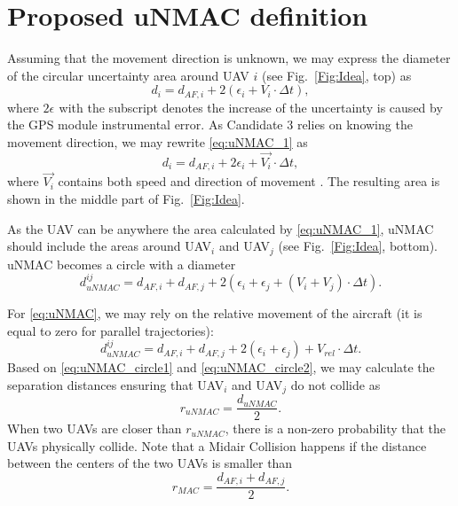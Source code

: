\documentclass[10pt,conference]{IEEEtran}
\begin{document}
\section{Proposed uNMAC definition}\label{sec:uNMAC}

Assuming that the movement direction is unknown, we may express the diameter of the circular uncertainty area around UAV $i$ (see Fig.~\ref{Fig:Idea}, top) as
\begin{equation}\label{eq:uNMAC_1}
    d_i = d_{AF,i} + 2(\epsilon_{i} + V_i\cdot\Delta t),
\end{equation}
where %
$2\epsilon_{}$ with the subscript denotes the increase of the uncertainty is caused by the GPS module instrumental error. As Candidate 3 relies on knowing the movement direction, we may rewrite \eqref{eq:uNMAC_1} as 
\begin{equation}\label{eq:uNMAC}
    d_i = d_{AF,i} + 2\epsilon_{i} + \vec{V_i}\cdot \Delta t,
\end{equation}
where $\vec{V_i}$ contains both speed and direction of movement%
. The resulting area is shown in the middle part of Fig.~\ref{Fig:Idea}.

As the UAV can be anywhere the area calculated by \eqref{eq:uNMAC_1}, uNMAC should include the areas around UAV$_i$ and UAV$_j$ (see Fig.~\ref{Fig:Idea}, bottom). uNMAC becomes a circle with a diameter
\begin{equation}\label{eq:uNMAC_circle1}
    d_{uNMAC}^{ij} = d_{AF,i}+d_{AF,j}+2(\epsilon_{i}+ \epsilon_{j}+ (V_i+ V_j)\cdot\Delta t).
\end{equation}

For \eqref{eq:uNMAC}, we may rely on the relative movement of the aircraft (it is equal to zero for parallel trajectories):
\begin{equation}\label{eq:uNMAC_circle2}
    d_{uNMAC}^{ij}= d_{AF,i}+d_{AF,j}+2(\epsilon_{i}+ \epsilon_{j})+V_{rel}\cdot\Delta t.
\end{equation}
Based on \eqref{eq:uNMAC_circle1} and \eqref{eq:uNMAC_circle2}, we may calculate the separation distances ensuring that UAV$_i$ and UAV$_j$ do not collide as
\begin{equation}\label{eq:separation}
r_{uNMAC}=\frac{d_{uNMAC}}{2}.
\end{equation}
When two UAVs are closer than $r_{uNMAC}$, there is a non-zero probability that the UAVs physically collide.
Note that a Midair Collision happens if the distance between the centers of the two UAVs is smaller than 
\begin{equation}
    r_{MAC}=\frac{d_{AF,i}+d_{AF,j}}{2}.
\end{equation} 
\end{document}
